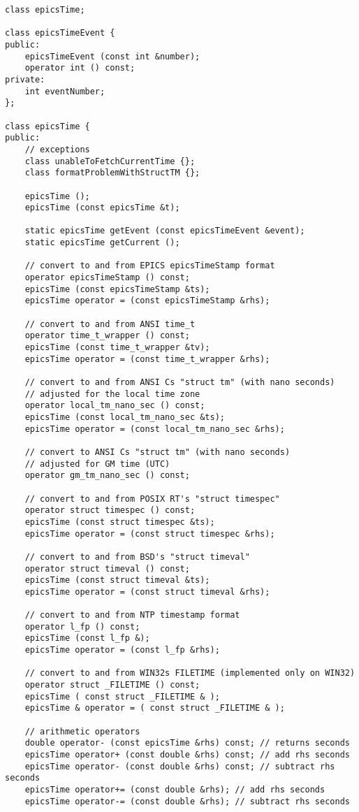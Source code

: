 \begin{verbatim}
class epicsTime;

class epicsTimeEvent {
public:
    epicsTimeEvent (const int &number);
    operator int () const;
private:
    int eventNumber;
};

class epicsTime {
public:
    // exceptions
    class unableToFetchCurrentTime {};
    class formatProblemWithStructTM {};

    epicsTime ();
    epicsTime (const epicsTime &t);

    static epicsTime getEvent (const epicsTimeEvent &event);
    static epicsTime getCurrent ();

    // convert to and from EPICS epicsTimeStamp format
    operator epicsTimeStamp () const;
    epicsTime (const epicsTimeStamp &ts);
    epicsTime operator = (const epicsTimeStamp &rhs);

    // convert to and from ANSI time_t 
    operator time_t_wrapper () const;
    epicsTime (const time_t_wrapper &tv);
    epicsTime operator = (const time_t_wrapper &rhs);

    // convert to and from ANSI Cs "struct tm" (with nano seconds)
    // adjusted for the local time zone
    operator local_tm_nano_sec () const;
    epicsTime (const local_tm_nano_sec &ts);
    epicsTime operator = (const local_tm_nano_sec &rhs);

    // convert to ANSI Cs "struct tm" (with nano seconds)
    // adjusted for GM time (UTC)
    operator gm_tm_nano_sec () const;

    // convert to and from POSIX RT's "struct timespec"
    operator struct timespec () const;
    epicsTime (const struct timespec &ts);
    epicsTime operator = (const struct timespec &rhs);

    // convert to and from BSD's "struct timeval"
    operator struct timeval () const;
    epicsTime (const struct timeval &ts);
    epicsTime operator = (const struct timeval &rhs);

    // convert to and from NTP timestamp format
    operator l_fp () const;
    epicsTime (const l_fp &);
    epicsTime operator = (const l_fp &rhs);

    // convert to and from WIN32s FILETIME (implemented only on WIN32)
    operator struct _FILETIME () const;
    epicsTime ( const struct _FILETIME & );
    epicsTime & operator = ( const struct _FILETIME & );

    // arithmetic operators
    double operator- (const epicsTime &rhs) const; // returns seconds
    epicsTime operator+ (const double &rhs) const; // add rhs seconds
    epicsTime operator- (const double &rhs) const; // subtract rhs seconds
    epicsTime operator+= (const double &rhs); // add rhs seconds
    epicsTime operator-= (const double &rhs); // subtract rhs seconds


\end{verbatim}
